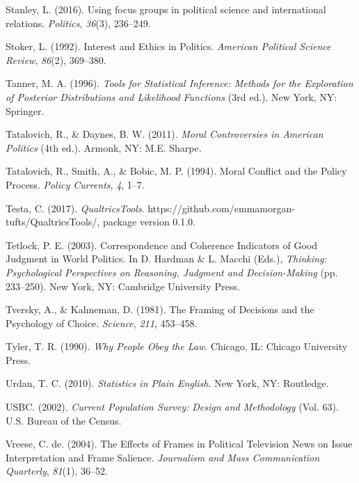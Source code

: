 \documentclass[12pt,econ]{sources/authesis}
\begin{document}
\leavevmode\hypertarget{ref-stanley_2016_using}{}%
Stanley, L. (2016). Using focus groups in political science and international relations. \emph{Politics}, \emph{36}(3), 236--249.

\leavevmode\hypertarget{ref-stoker_1992_interest}{}%
Stoker, L. (1992). Interest and Ethics in Politics. \emph{American Political Science Review}, \emph{86}(2), 369--380.

\leavevmode\hypertarget{ref-tanner_1996_tools}{}%
Tanner, M. A. (1996). \emph{Tools for Statistical Inference: Methods for the Exploration of Posterior Distributions and Likelihood Functions} (3rd ed.). New York, NY: Springer.

\leavevmode\hypertarget{ref-tatalovich_moral_2011}{}%
Tatalovich, R., \& Daynes, B. W. (2011). \emph{Moral Controversies in American Politics} (4th ed.). Armonk, NY: M.E. Sharpe.

\leavevmode\hypertarget{ref-tatalovich_moral_1994}{}%
Tatalovich, R., Smith, A., \& Bobic, M. P. (1994). Moral Conflict and the Policy Process. \emph{Policy Currents}, \emph{4}, 1--7.

\leavevmode\hypertarget{ref-testa_2017_qualtricstools}{}%
Testa, C. (2017). \emph{QualtricsTools}. https://github.com/emmamorgan-tufts/QualtricsTools/, package version 0.1.0.

\leavevmode\hypertarget{ref-tetlock_correspondence_2003}{}%
Tetlock, P. E. (2003). Correspondence and Coherence Indicators of Good Judgment in World Politics. In D. Hardman \& L. Macchi (Eds.), \emph{Thinking: Psychological Perspectives on Reasoning, Judgment and Decision-Making} (pp. 233--250). New York, NY: Cambridge University Press.

\leavevmode\hypertarget{ref-tversky_framing_1981}{}%
Tversky, A., \& Kahneman, D. (1981). The Framing of Decisions and the Psychology of Choice. \emph{Science}, \emph{211}, 453--458.

\leavevmode\hypertarget{ref-tyler_1990_people}{}%
Tyler, T. R. (1990). \emph{Why People Obey the Law}. Chicago, IL: Chicago University Press.

\leavevmode\hypertarget{ref-urdan_statistics_2010}{}%
Urdan, T. C. (2010). \emph{Statistics in Plain English}. New York, NY: Routledge.

\leavevmode\hypertarget{ref-census_2002_current}{}%
USBC. (2002). \emph{Current Population Survey: Design and Methodology} (Vol. 63). U.S. Bureau of the Census.

\leavevmode\hypertarget{ref-vreese_effects_2004}{}%
Vreese, C. de. (2004). The Effects of Frames in Political Television News on Issue Interpretation and Frame Salience. \emph{Journalism and Mass Communication Quarterly}, \emph{81}(1), 36--52.
\end{document}
